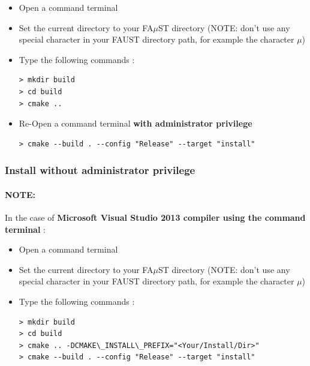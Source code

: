 \begin{itemize}
\item Open a command terminal
\item Set the current directory to your FA$\mu$ST directory (NOTE: don't use any special character in your FAUST directory path, for example the character $\mu$)
\item Type the following commands : 

\begin{lstlisting}
> mkdir build
> cd build
> cmake ..
\end{lstlisting}
\item Re-Open a command terminal \textbf{with administrator privilege} 
\begin{lstlisting}
> cmake --build . --config "Release" --target "install"
\end{lstlisting}
\end{itemize}

\subsubsection{Install without administrator privilege}
\label{sec:NoAdminWinVisualStudioTerminalBasicInstall}

\paragraph{NOTE:}In the case of \textbf{Microsoft Visual Studio 2013 compiler using the command terminal} :

\begin{itemize}
\item Open a command terminal
\item Set the current directory to your FA$\mu$ST directory (NOTE: don't use any special character in your FAUST directory path, for example the character $\mu$)
\item Type the following commands : 

\begin{lstlisting}
> mkdir build
> cd build
> cmake .. -DCMAKE\_INSTALL\_PREFIX="<Your/Install/Dir>" 
> cmake --build . --config "Release" --target "install"
\end{lstlisting}
\end{itemize}






